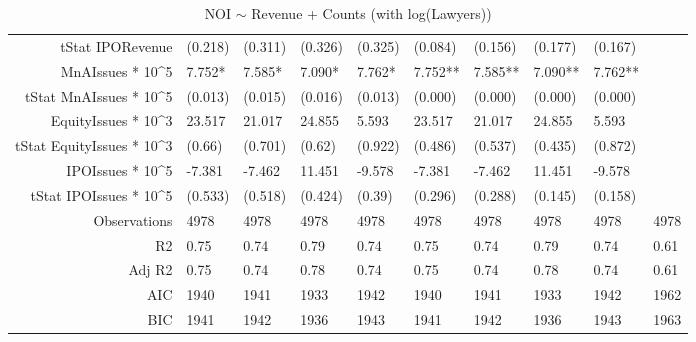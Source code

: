 \begin{table}[ht]
\begin{tabular}{rlllllllll}
  tStat IPORevenue & (0.218) & (0.311) & (0.326) & (0.325) & (0.084) & (0.156) & (0.177) & (0.167) &  \\ 
  MnAIssues * 10^5 & 7.752* & 7.585* & 7.090* & 7.762* & 7.752** & 7.585** & 7.090** & 7.762** &  \\ 
  tStat MnAIssues * 10^5 & (0.013) & (0.015) & (0.016) & (0.013) & (0.000) & (0.000) & (0.000) & (0.000) &  \\ 
  EquityIssues * 10^3 & 23.517 & 21.017 & 24.855 & 5.593 & 23.517 & 21.017 & 24.855 & 5.593 &  \\ 
  tStat EquityIssues * 10^3 & (0.66) & (0.701) & (0.62) & (0.922) & (0.486) & (0.537) & (0.435) & (0.872) &  \\ 
  IPOIssues * 10^5 & -7.381 & -7.462 & 11.451 & -9.578 & -7.381 & -7.462 & 11.451 & -9.578 &  \\ 
  tStat IPOIssues * 10^5 & (0.533) & (0.518) & (0.424) & (0.39) & (0.296) & (0.288) & (0.145) & (0.158) &  \\ 
  Observations & 4978 & 4978 & 4978 & 4978 & 4978 & 4978 & 4978 & 4978 & 4978 \\ 
  R2 & 0.75 & 0.74 & 0.79 & 0.74 & 0.75 & 0.74 & 0.79 & 0.74 & 0.61 \\ 
  Adj R2 & 0.75 & 0.74 & 0.78 & 0.74 & 0.75 & 0.74 & 0.78 & 0.74 & 0.61 \\ 
  AIC & 1940 & 1941 & 1933 & 1942 & 1940 & 1941 & 1933 & 1942 & 1962 \\ 
  BIC & 1941 & 1942 & 1936 & 1943 & 1941 & 1942 & 1936 & 1943 & 1963 \\ 
   \hline
\end{tabular}
\caption{NOI $\sim$ Revenue + Counts (with log(Lawyers))} 
\end{table}
